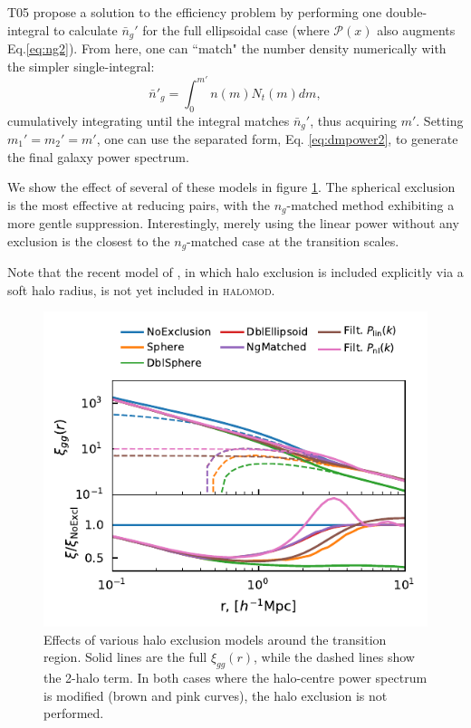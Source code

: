 \documentclass[5p,aas_macros]{elsarticle}
\newcommand{\halomod}{\textsc{halomod}}
\newcommand{\bd}[1]{\textcolor{purple}{\textbf{[BD: #1]}}}
\newcommand{\sgm}[1]{\textcolor{green}{\textbf{[SM: #1]}}}
\begin{document}
T05 propose a solution to the efficiency problem by performing one double-integral to calculate $\bar{n}_g'$ for the full ellipsoidal case (where $\mathcal{P}(x)$ also augments Eq.\ref{eq:ng2}). From here, one can ``match" the number density numerically with the simpler single-integral:
\begin{equation}
\label{eq:theory:ng_dash}
 \bar{n}'_g = \int_0^{m'} n(m)N_t(m)dm,
\end{equation}
cumulatively integrating until the integral matches $\bar{n}_g'$, thus acquiring $m'$. 
Setting $m_1' = m_2' = m'$, one can use the separated form,  Eq. \ref{eq:dmpower2}, to generate the final galaxy power spectrum.

We show the effect of several of these models in figure \ref{fig:halo_exclusion}. The spherical exclusion is the most effective at reducing pairs, with the $n_g$-matched method exhibiting a more gentle suppression. Interestingly, merely using the linear power without any exclusion is the closest to the $n_g$-matched case at the transition scales. 

Note that the recent model of \cite{Garcia2020}, in which halo exclusion is included explicitly via a soft halo radius, is not yet included in \halomod.


\begin{figure}
  \centering
  \includegraphics[width=\linewidth]{figures/halo_exclusion.pdf}
  \caption[Effect of halo exclusion]{Effects of various halo exclusion models around the transition region. Solid lines are the full $\xi_{gg}(r)$, while the dashed lines show the 2-halo term. In both cases where the halo-centre power spectrum is modified (brown and pink curves), the halo exclusion is not performed. }
  \label{fig:halo_exclusion}
\end{figure}
\end{document}
